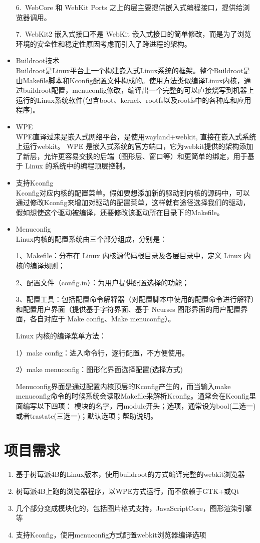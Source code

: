 \documentclass[UTF8,14pt]{article}
\numberwithin{figure}{section}
\begin{document}
\begin{itemize}
	      6.\ WebCore 和 WebKit Ports 之上的层主要提供嵌入式编程接口，提供给浏览器调用。

	      7.\ WebKit2 嵌入式接口不是 WebKit 嵌入式接口的简单修改，而是为了浏览环境的安全性和稳定性原因考虑而引入了跨进程的架构。
	\item Buildroot技术\\
	      Buildroot是Linux平台上一个构建嵌入式Linux系统的框架。整个Buildroot是由Makefile脚本和Kconfig配置文件构成的。使用方法类似编译Linux内核，通过buildroot配置，menuconfig修改，编译出一个完整的可以直接烧写到机器上运行的Linux系统软件(包含boot、kernel、rootfs以及rootfs中的各种库和应用程序)。
	\item WPE\\
	      WPE直译过来是嵌入式网络平台，是使用wayland+webkit, 直接在嵌入式系统上运行webkit。
	      WPE 是嵌入式系统的官方端口，它为webkit提供的架构添加了新层，允许更容易交换的后端（图形层、窗口等）和更简单的绑定，用于基于 Linux 的系统中的编程顶层控制。
	\item 支持Kconfig\\
	      Kconfig对应内核的配置菜单。假如要想添加新的驱动到内核的源码中，可以通过修改Kconfig来增加对驱动的配置菜单，这样就有途径选择我们的驱动，假如想使这个驱动被编译，还要修改该驱动所在目录下的Makefile。
	\item Menuconfig\\
	      Linux内核的配置系统由三个部分组成，分别是：

	      1、Makefile：分布在 Linux 内核源代码根目录及各层目录中，定义 Linux 内核的编译规则；

	      2、配置文件（config.in）：为用户提供配置选择的功能；

	      3、配置工具：包括配置命令解释器（对配置脚本中使用的配置命令进行解释）和配置用户界面（提供基于字符界面、基于 Ncurses 图形界面的用户配置界面，各自对应于 Make config、Make menuconfig）。

	      Linux 内核的编译菜单方法：

	      1）make config：进入命令行，逐行配置，不方便使用。

	      2）make menuconfig：图形化界面选择配置(选择方式)

	      Menuconfig界面是通过配置内核顶层的Kconfig产生的，而当输入make menuconfig命令的时候系统会读取Makefile来解析Kconfig。通常会在Kconfig里面编写以下四项：
	      模块的名字，用module开头；选项，通常设为bool(二选一)或者trastate(三选一)；默认选项；帮助说明。
\end{itemize}
\section{项目需求}
\begin{enumerate}
	\item 基于树莓派4B的Linux版本，使用buildroot的方式编译完整的webkit浏览器
	\item 树莓派4B上跑的浏览器程序，以WPE方式运行，而不依赖于GTK+或Qt
	\item 几个部分变成模块化的，包括图片格式支持，JavaScriptCore，图形渲染引擎等
	\item 支持Kconfig，使用menuconfig方式配置webkit浏览器编译选项
\end{enumerate}
\end{document}
